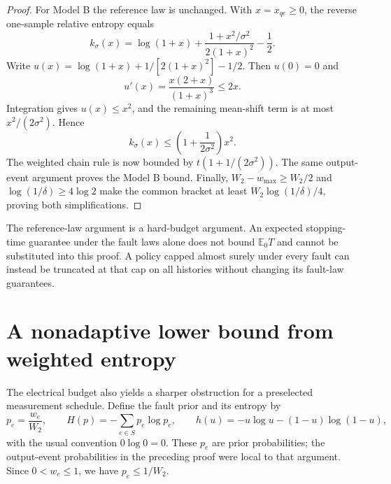 \documentclass[11pt,letterpaper]{article}
\begin{document}
\begin{proof}
For Model B the reference law is unchanged. With $x=x_{qe}\ge0$, the reverse one-sample relative entropy equals
\[
 k_\sigma(x)=\log(1+x)+\frac{1+x^2/\sigma^2}{2(1+x)^2}-\frac12.
\]
Write $u(x)=\log(1+x)+1/[2(1+x)^2]-1/2$. Then $u(0)=0$ and
\[
 u'(x)=\frac{x(2+x)}{(1+x)^3}\le2x.
\]
Integration gives $u(x)\le x^2$, and the remaining mean-shift term is at most $x^2/(2\sigma^2)$. Hence
\[
 k_\sigma(x)\le\left(1+\frac{1}{2\sigma^2}\right)x^2.
\]
The weighted chain rule is now bounded by $t(1+1/(2\sigma^2))$. The same output-event argument proves the Model B bound. Finally, $W_2-w_{\max}\ge W_2/2$ and $\log(1/\delta)\ge4\log2$ make the common bracket at least $W_2\log(1/\delta)/4$, proving both simplifications.
\end{proof}

The reference-law argument is a hard-budget argument. An expected stopping-time guarantee under the fault laws alone does not bound $\mathbb E_0T$ and cannot be substituted into this proof. A policy capped almost surely under every fault can instead be truncated at that cap on all histories without changing its fault-law guarantees.

\section{A nonadaptive lower bound from weighted entropy}\label{sec:nonadaptive-lower}
The electrical budget also yields a sharper obstruction for a preselected measurement schedule. Define the fault prior and its entropy by
\[
 p_e=\frac{w_e}{W_2},\qquad
 H(p)=-\sum_{e\in S}p_e\log p_e,\qquad
 h(u)=-u\log u-(1-u)\log(1-u),
\]
with the usual convention $0\log0=0$. These $p_e$ are prior probabilities; the output-event probabilities in the preceding proof were local to that argument. Since $0<w_e\le1$, we have $p_e\le1/W_2$.
\end{document}
